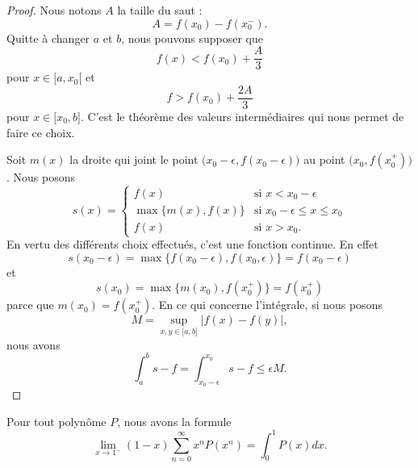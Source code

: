 \begin{proof}
	Nous notons \( A\) la taille du saut :
	\begin{equation}
		A=f(x_0)-f(x_0^-).
	\end{equation}
	Quitte à changer \( a\) et \( b\), nous pouvons supposer que
	\begin{equation}
		f(x)<f(x_0)+\frac{ A }{ 3 }
	\end{equation}
	pour \( x\in \mathopen[ a , x_0 [\) et
	\begin{equation}
		f>f(x_0)+\frac{ 2A }{ 3 }
	\end{equation}
	pour \( x\in \mathopen[ x_0 , b \mathclose]\). C'est le théorème des valeurs intermédiaires qui nous permet de faire ce choix.

	Soit \( m(x)\) la droite qui joint le point \( \big( x_0-\epsilon, f(x_0-\epsilon) \big)\) au point \( \big( x_0,f(x_0^+) \big)\). Nous posons
	\begin{equation}
		s(x)=\begin{cases}
			f(x)                & \text{si } x<x_0-\epsilon             \\
			\max\{ m(x),f(x) \} & \text{si } x_0-\epsilon\leq x\leq x_0 \\
			f(x)                & \text{si } x>x_0.
		\end{cases}
	\end{equation}
	En vertu des différents choix effectués, c'est une fonction continue. En effet
	\begin{equation}
		s(x_0-\epsilon)=\max\{ f(x_0-\epsilon),f(x_0,\epsilon) \}=f(x_0-\epsilon)
	\end{equation}
	et
	\begin{equation}
		s(x_0)=\max\{ m(x_0),f(x_0^+) \}=f(x_0^+)
	\end{equation}
	parce que \( m(x_0)=f(x_0^+)\). En ce qui concerne l'intégrale, si nous posons
	\begin{equation}
		M=\sup_{x,y\in \mathopen[ a , b \mathclose]}| f(x)-f(y) |,
	\end{equation}
	nous avons
	\begin{equation}
		\int_a^bs-f=\int_{x_0-\epsilon}^{x_0}s-f\leq \epsilon M.
	\end{equation}
\end{proof}

\begin{lemma}\label{LemauxrKN}
	Pour tout polynôme \( P\), nous avons la formule
	\begin{equation}
		\lim_{x\to 1^-} (1-x)\sum_{n=0}^{\infty}x^nP(x^n)=\int_0^1P(x)dx.
	\end{equation}
\end{lemma}

